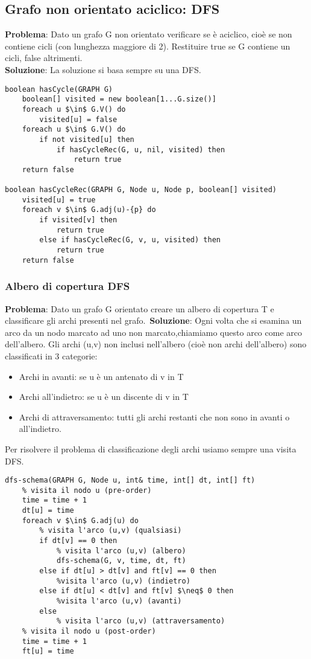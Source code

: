 \documentclass[../cheatSheetAlgoritmi.tex]{subfiles}
\begin{document}
\subsection{Grafo non orientato aciclico: DFS}
\textbf{Problema}: Dato un grafo G non orientato verificare se è aciclico, cioè se non contiene cicli (con lunghezza maggiore di 2). Restituire true se G contiene un cicli, false altrimenti.\\
\textbf{Soluzione}: La soluzione si basa sempre su una DFS. \
\begin{lstlisting}[caption= Grafo non orientato aciclico (hasCycle)]
boolean hasCycle(GRAPH G)
	boolean[] visited = new boolean[1...G.size()]
	foreach u $\in$ G.V() do
		visited[u] = false
	foreach u $\in$ G.V() do
		if not visited[u] then
			if hasCycleRec(G, u, nil, visited) then
				return true
	return false

boolean hasCycleRec(GRAPH G, Node u, Node p, boolean[] visited)
	visited[u] = true
	foreach v $\in$ G.adj(u)-{p} do
		if visited[v] then
			return true
		else if hasCycleRec(G, v, u, visited) then
			return true
	return false
\end{lstlisting}

\newpage
\subsubsection{Albero di copertura DFS}
\textbf{Problema}: Dato un grafo G orientato creare un albero di copertura T e classificare gli archi presenti nel grafo.\
\textbf{Soluzione}: Ogni volta che si esamina un arco da un nodo marcato ad uno non marcato,chiamiamo questo arco come arco dell'albero. Gli archi (u,v) non inclusi nell'albero (cioè non archi dell'albero) sono classificati in 3 categorie: 

\begin{itemize}
 	\item Archi in avanti: se u è un antenato di v in T
 	\item Archi all'indietro: se u è un discente di v in T
 	\item Archi di attraversamento: tutti gli archi restanti che non sono in avanti o all'indietro.
\end{itemize}
Per risolvere il problema di classificazione degli archi usiamo sempre una visita DFS.

\begin{lstlisting}[caption= Albero di copertura]
% time: contatore, dt: discovery time (tempo di scoperta del nodo), ft: finish time (tempo di fine visita del nodo e dei suoi archi)
dfs-schema(GRAPH G, Node u, int& time, int[] dt, int[] ft)
	% visita il nodo u (pre-order)
	time = time + 1
	dt[u] = time
	foreach v $\in$ G.adj(u) do
		% visita l'arco (u,v) (qualsiasi)
		if dt[v] == 0 then
			% visita l'arco (u,v) (albero)
			dfs-schema(G, v, time, dt, ft)
		else if dt[u] > dt[v] and ft[v] == 0 then
			%visita l'arco (u,v) (indietro)
		else if dt[u] < dt[v] and ft[v] $\neq$ 0 then
			%visita l'arco (u,v) (avanti)
		else
			% visita l'arco (u,v) (attraversamento) 
	% visita il nodo u (post-order)
	time = time + 1
	ft[u] = time
\end{lstlisting}
\end{document}
